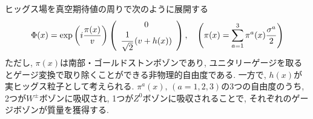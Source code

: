 \documentclass[uplatex,dvipdfmx,a4paper,titlepage]{jsbook}
\theoremstyle{plain}
\theoremstyle{definition}
\begin{document}
ヒッグス場を真空期待値の周りで次のように展開する
\begin{align}
  \Phi(x) = \exp\left(i\frac{\pi(x)}{v}\right)\left(
  \begin{array}{c}
    0 \\
    \cfrac{1}{\sqrt{2}}\left(v + h(x)\right)
  \end{array}
\right),\quad \left(\pi(x) = \sum_{a=1}^3\pi^a(x)\frac{\sigma^a}{2}\right)\label{higgs}
\end{align}
ただし, $\pi(x)$は南部・ゴールドストンボゾンであり, ユニタリーゲージを取るとゲージ変換で取り除くことができる非物理的自由度である.
一方で, $h(x)$が実ヒッグス粒子として考えられる.
$\pi^a(x),\,(a=1,2,3)$の3つの自由度のうち,  2つが$W^\pm$ボゾンに吸収され, 1つが$Z^0$ボゾンに吸収されることで, それぞれのゲージボゾンが質量を獲得する.
\end{document}
